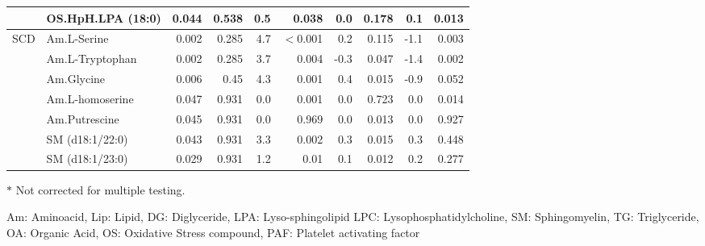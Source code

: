 \documentclass{amsart}
\begin{document}
\begin{table}[H]
\begin{threeparttable}
\begin{tabular}{clrrrrrrrr}
   & OS.HpH.LPA (18:0) & 0.044 & 0.538 & {\cellcolor[rgb]{0.988,0.988,1}}0.5 & 0.038 & {\cellcolor[rgb]{0.984,0.957,0.969}}0.0 & 0.178 & {\cellcolor[rgb]{0.984,0.965,0.976}}0.1 & 0.013 \\ \midrule
  \multirow{7}{*}{SCD} & Am.L-Serine & 0.002 & 0.285 & {\cellcolor[rgb]{0.914,0.961,0.937}}4.7 & $<$0.001 & {\cellcolor[rgb]{0.984,0.973,0.984}}0.2 & 0.115 & {\cellcolor[rgb]{0.98,0.839,0.851}}-1.1 & 0.003 \\
   & Am.L-Tryptophan & 0.002 & 0.285 & {\cellcolor[rgb]{0.929,0.965,0.949}}3.7 & 0.004 & {\cellcolor[rgb]{0.984,0.922,0.933}}-0.3 & 0.047 & {\cellcolor[rgb]{0.98,0.808,0.82}}-1.4 & 0.002 \\
   & Am.Glycine & 0.006 & 0.45 & {\cellcolor[rgb]{0.922,0.961,0.941}}4.3 & 0.001 & {\cellcolor[rgb]{0.988,0.988,1}}0.4 & 0.015 & {\cellcolor[rgb]{0.984,0.859,0.871}}-0.9 & 0.052 \\
   & Am.L-homoserine & 0.047 & 0.931 & {\cellcolor[rgb]{0.984,0.953,0.965}}0.0 & 0.001 & {\cellcolor[rgb]{0.984,0.953,0.965}}0.0 & 0.723 & {\cellcolor[rgb]{0.984,0.953,0.965}}0.0 & 0.014 \\
   & Am.Putrescine & 0.045 & 0.931 & {\cellcolor[rgb]{0.984,0.953,0.965}}0.0 & 0.969 & {\cellcolor[rgb]{0.984,0.953,0.965}}0.0 & 0.013 & {\cellcolor[rgb]{0.984,0.953,0.965}}0.0 & 0.927 \\
   & SM (d18:1/22:0) & 0.043 & 0.931 & {\cellcolor[rgb]{0.937,0.969,0.957}}3.3 & 0.002 & {\cellcolor[rgb]{0.984,0.984,0.996}}0.3 & 0.015 & {\cellcolor[rgb]{0.984,0.98,0.992}}0.3 & 0.448 \\
   & SM (d18:1/23:0) & 0.029 & 0.931 & {\cellcolor[rgb]{0.973,0.984,0.988}}1.2 & 0.01 & {\cellcolor[rgb]{0.984,0.969,0.98}}0.1 & 0.012 & {\cellcolor[rgb]{0.984,0.973,0.984}}0.2 & 0.277 \\ \bottomrule
\end{tabular}
\begin{tablenotes}
  \item[$\ast$] Not corrected for multiple testing.
  \item[] Am: Aminoacid, Lip: Lipid, DG: Diglyceride, LPA: Lyso-sphingolipid LPC: Lysophosphatidylcholine, SM: Sphingomyelin, TG: Triglyceride, OA: Organic Acid, OS: Oxidative Stress compound, PAF: Platelet activating factor
\end{tablenotes}
\end{threeparttable}
\end{table}
\newpage
\end{document}
